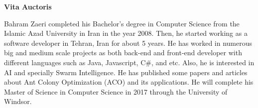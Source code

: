 \documentclass[12pt,oneside]{book}
\begin{document}


\newpage

	
	
	
	
	
	
	
	\appendix
%	



	
	
	
		{\centering
			\textbf{Vita Auctoris}
	\par}
	Bahram Zaeri completed his Bachelor's degree in Computer Science from the Islamic Azad University in Iran in the year 2008. Then, he started working as a software developer in Tehran, Iran for about 5 years. He has worked in numerous big and medium scale projects as both back-end and front-end developer with different languages such as Java, Javascript, C#, and etc. Also, he is interested in AI and specially Swarm Intelligence. He has published some papers and articles about Ant Colony Optimization (ACO) and its applications. He will complete his Master of Science in Computer Science in 2017 through the University of Windsor. 
\end{document}
